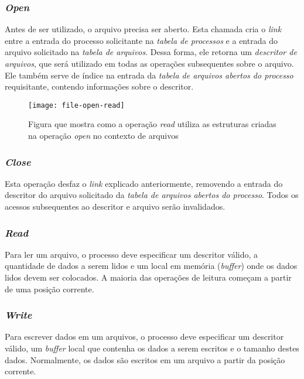 \subsubsection{\textit{Open}}
Antes de ser utilizado, o arquivo precisa ser aberto. Esta chamada cria o \textit{link} entre a entrada do processo solicitante na \textit{tabela de processos} e a entrada do arquivo solicitado na \textit{tabela de arquivos}. Dessa forma, ele retorna um \textit{descritor de arquivos}, que será utilizado em todas as operações subsequentes sobre o arquivo. Ele também serve de índice na entrada da \textit{tabela de arquivos abertos do processo} requisitante, contendo informações sobre o descritor.

\begin{figure}[h]
  \centering
  \texttt{[image: file-open-read]}
  \caption{Figura que mostra como a operação \textit{read} utiliza as estruturas criadas na operação \textit{open} no contexto de arquivos}
  \label{fig:file-open-read}
\end{figure}

\subsubsection{\textit{Close}}
Esta operação desfaz o \textit{link} explicado anteriormente, removendo a entrada do descritor do arquivo solicitado da \textit{tabela de arquivos abertos do processo}. Todos os acessos subsequentes ao descritor e arquivo serão invalidados.


\subsubsection{\textit{Read}}
Para ler um arquivo, o processo deve especificar um descritor válido, a quantidade de dados a serem lidos e um local em memória (\textit{buffer}) onde os dados lidos devem ser colocados. A maioria das operações de leitura começam a partir de uma posição corrente.

\subsubsection{\textit{Write}}
Para escrever dados em um arquivos, o processo deve especificar um descritor válido, um \textit{buffer} local que contenha os dados a serem escritos e o tamanho destes dados. Normalmente, os dados são escritos em um arquivo a partir da posição corrente.

